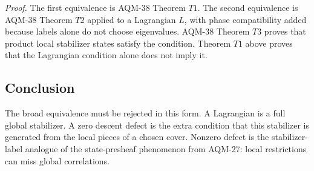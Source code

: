 \emph{Proof.}
The first equivalence is AQM-38 Theorem \(T1\).  The second equivalence is
AQM-38 Theorem \(T2\) applied to a Lagrangian \(L\), with phase compatibility
added because labels alone do not choose eigenvalues.  AQM-38 Theorem \(T3\)
proves that product local stabilizer states satisfy the condition.  Theorem
\(T1\) above proves that the Lagrangian condition alone does not imply it.

\subsection{Conclusion}

The broad equivalence must be rejected in this form.  A Lagrangian is a full
global stabilizer.  A zero descent defect is the extra condition that this
stabilizer is generated from the local pieces of a chosen cover.  Nonzero
defect is the stabilizer-label analogue of the state-presheaf phenomenon from
AQM-27: local restrictions can miss global correlations.
